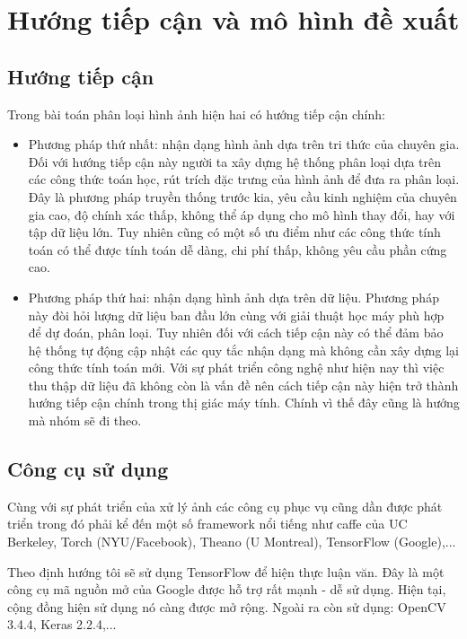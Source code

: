 
\chapter{Hướng tiếp cận và mô hình đề xuất}
\section{Hướng tiếp cận}

Trong bài toán phân loại hình ảnh hiện hai có hướng tiếp cận chính:
\begin{itemize}
\item Phương pháp thứ nhất: nhận dạng hình ảnh dựa trên tri thức của chuyên gia. Đối với hướng tiếp cận này người ta xây dựng hệ thống phân loại dựa trên các công thức toán học, rút trích đặc trưng của hình ảnh để đưa ra phân loại. Đây là phương pháp truyền thống trước kia, yêu cầu kinh nghiệm của chuyên gia cao, độ chính xác thấp, không thể áp dụng  cho mô hình thay đổi, hay với tập dữ liệu lớn. Tuy nhiên cũng có một số ưu điểm như các công thức tính toán có thể được tính toán dễ dàng, chi phí thấp, không yêu cầu phần cứng cao.
\item Phương pháp thứ hai: nhận dạng hình ảnh dựa trên dữ liệu. Phương pháp này đòi hỏi lượng dữ liệu ban đầu lớn cùng với giải thuật học máy phù hợp để dự đoán, phân loại. Tuy nhiên đối với cách tiếp cận này có thể đảm bảo hệ thống tự động cập nhật các quy tắc nhận dạng mà không cần xây dựng lại công thức tính toán mới. Với sự phát triển công nghệ như hiện nay thì việc thu thập dữ liệu đã không còn là vấn đề nên cách tiếp cận này hiện trở thành hướng tiếp  cận chính trong thị giác máy tính. Chính vì thế đây cũng là hướng mà nhóm sẽ đi theo.
\end{itemize}
\section{Công cụ sử dụng}
Cùng với sự phát triển của xử lý ảnh các công cụ phục vụ cũng dần được phát triển trong đó phải kể đến một số framework nổi tiếng như caffe của UC Berkeley, Torch (NYU/Facebook), Theano (U Montreal), TensorFlow (Google),...

Theo định hướng tôi sẽ sử dụng TensorFlow để hiện thực luận văn. Đây là một công cụ mã nguồn mở của Google được hỗ trợ rất mạnh - dễ sử dụng. Hiện tại, cộng đồng hiện sử dụng nó càng được mở rộng.
Ngoài ra còn sử dụng: OpenCV 3.4.4, Keras 2.2.4,...

